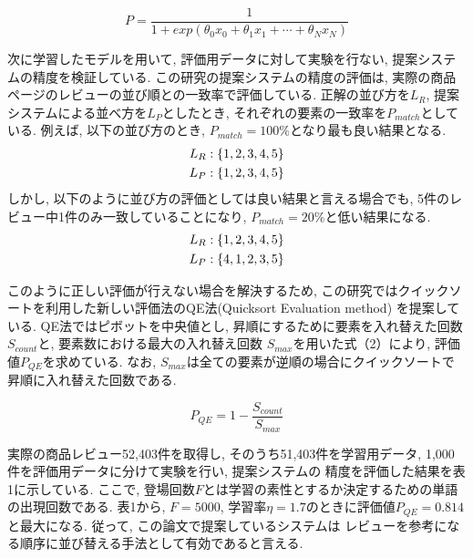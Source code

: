 \documentclass{ltjarticle}
\begin{document}
\begin{equation}
    P=\dfrac{1}{1+exp(\theta_0x_0+\theta_1x_1+\cdots+\theta_Nx_N)}
\end{equation}
\vspace{5truept}

次に学習したモデルを用いて, 評価用データに対して実験を行ない, 提案システムの精度を検証している. 
この研究の提案システムの精度の評価は, 実際の商品ページのレビューの並び順との一致率で評価している. 
正解の並び方を$L_R$, 提案システムによる並べ方を$L_P$としたとき, それぞれの要素の一致率を$P_{match}$としている. 
例えば, 以下の並び方のとき, $P_{match}=100\%$となり最も良い結果となる. 
\begin{align}
    L_R:\{1,2,3,4,5\}\notag\\
    L_P:\{1,2,3,4,5\}\notag
\end{align}
しかし, 以下のように並び方の評価としては良い結果と言える場合でも, 5件のレビュー中1件のみ一致していることになり, 
$P_{match}=20\%$と低い結果になる. 
\begin{align}
    L_R:\{1,2,3,4,5\}\notag\\
    L_P:\{4,1,2,3,5\}\notag
\end{align}

このように正しい評価が行えない場合を解決するため, この研究ではクイックソートを利用した新しい評価法のQE法(Quicksort Evaluation method)
を提案している. QE法ではピボットを中央値とし, 昇順にするために要素を入れ替えた回数$S_{count}$と, 要素数における最大の入れ替え回数
$S_{max}$を用いた式（2）により, 評価値$P_{QE}$を求めている. なお, $S_{max}$は全ての要素が逆順の場合にクイックソートで
昇順に入れ替えた回数である. 
\vspace{5truept}

\begin{equation}
    P_{QE}=1-\dfrac{S_{count}}{S_{max}}
\end{equation}
\vspace{5truept}

実際の商品レビュー52,403件を取得し, そのうち51,403件を学習用データ, 1,000件を評価用データに分けて実験を行い, 提案システムの
精度を評価した結果を表1に示している. 
ここで, 登場回数$F$とは学習の素性とするか決定するための単語の出現回数である. 
表1から, $F=5000$, 学習率$\eta=1.7$のときに評価値$P_{QE}=0.814$と最大になる. 従って, この論文で提案しているシステムは
レビューを参考になる順序に並び替える手法として有効であると言える. 
\end{document}

